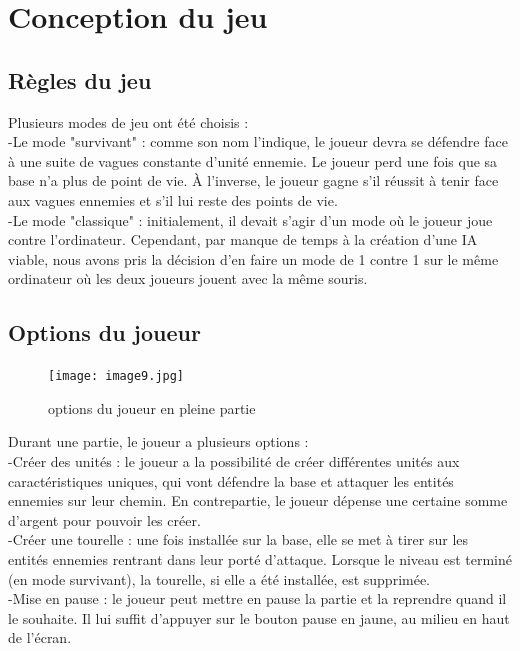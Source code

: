 \documentclass[a4paper,11pt]{article}
\begin{document}
\section {Conception du jeu}
\subsection {Règles du jeu}

Plusieurs modes de jeu ont été choisis :\\

-Le mode "survivant" : comme son nom l'indique, le joueur devra se défendre face à une suite de vagues constante d'unité ennemie. Le joueur perd une fois que sa base n'a plus de point de vie. À l'inverse, le joueur gagne s'il réussit à tenir face aux vagues ennemies et s'il lui reste des points de vie.\\

-Le mode "classique" : initialement, il devait s'agir d'un mode où le joueur joue contre l'ordinateur. Cependant, par manque de temps à la création d'une IA viable, nous avons pris la décision d'en faire un mode de 1 contre 1 sur le même ordinateur où les deux joueurs jouent avec la même souris.\\

\subsection {Options du joueur}
\begin{figure}[ht!]
\centering
\texttt{[image: image9.jpg]} 
\caption {\label{image1} options du joueur en pleine partie}
\end{figure}
 \smallbreak
Durant une partie, le joueur a plusieurs options :\\

-Créer des unités : le joueur a la possibilité de créer différentes unités aux caractéristiques uniques, qui vont défendre la base et attaquer les entités ennemies sur leur chemin. En contrepartie, le joueur dépense une certaine somme d'argent pour pouvoir les créer.\\

-Créer une tourelle : une fois installée sur la base, elle se met à tirer sur les entités ennemies rentrant dans leur porté d'attaque. Lorsque le niveau est terminé (en mode survivant), la tourelle, si elle a été installée, est supprimée.\\

-Mise en pause : le joueur peut mettre en pause la partie et la reprendre quand il le souhaite. Il lui suffit d'appuyer sur le bouton pause en jaune, au milieu en haut de l'écran.\\
\end{document}
